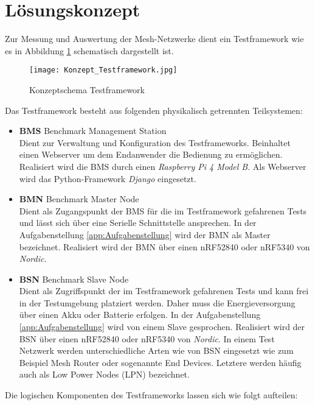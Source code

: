 \clearpage
\section{Lösungskonzept}\label{sec:Loesungskonzept}
Zur Messung und Auswertung der Mesh-Netzwerke dient ein Testframework wie es in Abbildung \ref{fig:KonzeptschemaTestframework} schematisch dargestellt ist.

\begin{figure}[H]
	\centering
	\texttt{[image: Konzept\_Testframework.jpg]}
	\caption{Konzeptschema Testframework}\label{fig:KonzeptschemaTestframework}
\end{figure}


Das Testframework besteht aus folgenden physikalisch getrennten Teilsystemen:

\begin{itemize}
	\item \textbf{BMS} Benchmark Management Station \\ 
	Dient zur Verwaltung und Konfiguration des Testframeworks. Beinhaltet einen Webserver um dem Endanwender die Bedienung zu ermöglichen. Realisiert wird die BMS durch einen \textit{Raspberry Pi 4 Model B}. Als Webserver wird das Python-Framework \textit{Django} eingesetzt. 
	\item \textbf{BMN} Benchmark Master Node \\ 
	Dient als Zugangspunkt der BMS für die im Testframework gefahrenen Tests und lässt sich über eine Serielle Schnittstelle ansprechen. In der Aufgabenstellung \ref{app:Aufgabenstellung} wird der BMN als Master bezeichnet. Realisiert wird der BMN über einen nRF52840 oder nRF5340 von \textit{Nordic}. 
	\item \textbf{BSN} Benchmark Slave Node \\ 
	Dient als Zugriffspunkt der im Testframework gefahrenen Tests und kann frei in der Testumgebung platziert werden. Daher muss die Energieversorgung über einen Akku oder Batterie erfolgen. In der Aufgabenstellung  \ref{app:Aufgabenstellung} wird von einem Slave gesprochen. Realisiert wird der BSN über einen nRF52840 oder nRF5340 von \textit{Nordic}. In einem Test Netzwerk werden unterschiedliche Arten wie von BSN eingesetzt wie zum Beispiel Mesh Router oder sogenannte End Devices. Letztere werden häufig auch als Low Power Nodes (LPN) bezeichnet.
\end{itemize}

Die logischen Komponenten des Testframeworks lassen sich wie folgt aufteilen:

